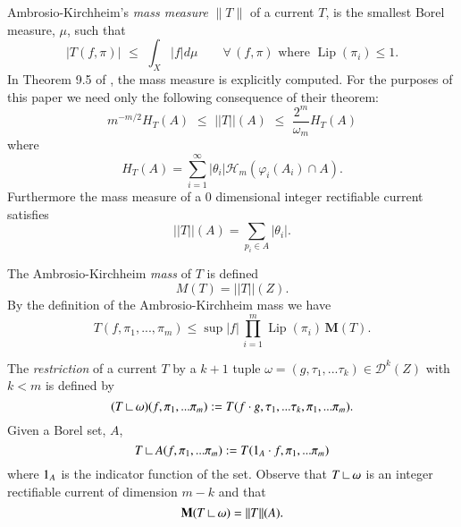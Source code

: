 \documentclass[12pt]{amsart}
\begin{document}
Ambrosio-Kirchheim's {\em mass measure} $\|T\| $
of a current $T$, is the smallest Borel measure, $\mu$, such that
\begin{equation} \label{def-measure-T}
  \Big|T\left(f,\pi\right)\Big|  \,\,  \le \,\,    \int_X |f| d\mu
  \qquad  \forall  \, \left(f,\pi\right) \textrm{ where } {\operatorname{Lip}}\left(\pi_i\right)\le 1.
\end{equation}  
In Theorem 9.5 of \cite{AK}, the mass measure is explicitly computed.
For the purposes of this paper we need only the following consequence
of their theorem:
\begin{equation}
m^{-m/2} H_T(A)
\,\,\le\,\, 
||T||(A) 
\,\,\le\,\, 
\frac{2^m}{\omega_m}H_T(A)
\end{equation}
where
\begin{equation}
H_T(A)=\sum_{i=1}^\infty |\theta_i| \mathcal{H}_m(\varphi_i(A_i)\cap A).
\end{equation}
Furthermore the mass measure of a $0$ dimensional integer rectifiable current 
satisfies 
\begin{equation}
||T||(A) = \sum_{p_i\in A} |\theta_i|.
\end{equation}

The Ambrosio-Kirchheim {\em mass} of $T$ is defined
\begin{equation} \label{def-mass-from-current}
M\left(T\right) = || T || \left(Z\right). 
\end{equation}
By the definition of the Ambrosio-Kirchheim mass we have
\begin{equation} \label{mass-prod-lip}
T(f, \pi_1, ...,\pi_m) \le \sup|f| \,\prod_{i=1}^m {\operatorname{Lip}}(\pi_i) \,{{\mathbf M}}(T).
\end{equation}

The {\em restriction}
of a current $T$ by a $k+1$ tuple 
 $\omega=(g,\tau_1,...\tau_k)\in \mathcal{D}^k(Z)$ with $k<m$ is
 defined by
\begin{equation} \label{defn-rstr}
(T{\:\mbox{\rule{0.1ex}{1.2ex}\rule{1.1ex}{0.1ex}}\:}\omega)(f,\pi_1,...\pi_m):=T(f\cdot g, \tau_1,...\tau_k, \pi_1,...\pi_m).
\end{equation}
Given a Borel set, $A$, 
\begin{equation}   
T{\:\mbox{\rule{0.1ex}{1.2ex}\rule{1.1ex}{0.1ex}}\:} A (f,\pi_1,...\pi_m):= T( {{\bf \rm{1}}}_A \cdot f,\pi_1,...\pi_m)
\end{equation}
where ${{\bf \rm{1}}}_A$ is the indicator
function of the set.  Observe that $T{\:\mbox{\rule{0.1ex}{1.2ex}\rule{1.1ex}{0.1ex}}\:} \omega$ is an 
integer rectifiable current of dimension $m-k$ and that
\begin{equation}
{{\mathbf M}}(T{\:\mbox{\rule{0.1ex}{1.2ex}\rule{1.1ex}{0.1ex}}\:} \omega) = ||T||(A).
\end{equation}
\end{document}
